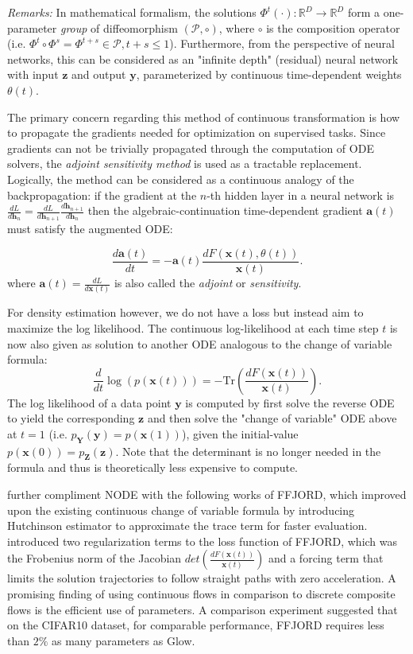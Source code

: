 \textit{Remarks: } In mathematical formalism, the solutions $\Phi^t(\cdot):
\mathbb{R}^D \to \mathbb{R}^D$ form a one-parameter \textit{group} of diffeomorphism
$(\mathcal{P}, \circ)$, where $\circ$ is the composition operator (i.e. $\Phi^t
\circ \Phi^s = \Phi^{t+s} \in \mathcal{P}, t+s \leq 1$). Furthermore, from the
perspective of neural networks, this can be considered as an "infinite depth"
(residual) neural network with input $\mathbf{z}$ and output $\mathbf{y}$,
parameterized by continuous time-dependent weights $\theta(t)$.

The primary concern regarding this method of continuous transformation is how
to propagate the gradients needed for optimization on supervised tasks. Since
gradients can not be trivially propagated through the computation of ODE
solvers, the \textit{adjoint sensitivity method} is used as a tractable
replacement. Logically, the method can be considered as a continuous analogy of
the backpropagation: if the gradient at the $n$-th hidden layer in a neural
network is $\frac{dL}{d \textbf{h}_n} = \frac{dL}{d \mathbf{h}_{n+1}} \frac{d
\mathbf{h}_{n+1}}{d \mathbf{h}_n}$ then the algebraic-continuation
time-dependent gradient $\mathbf{a}(t)$ must satisfy the augmented ODE:

$$
\frac{d\mathbf{a}(t)}{dt} = -\mathbf{a}(t) \frac{dF(\mathbf{x}(t),
\theta(t))}{\mathbf{x}(t)}
.$$
where $\mathbf{a}(t) = \frac{dL}{d\mathbf{x}(t)}$ is also called the \textit{adjoint} or
\textit{sensitivity}.

For density estimation however, we do not have a loss but instead aim to
maximize the log likelihood. The continuous log-likelihood
at each time step $t$ is now also given as solution to another ODE analogous to
the change of variable formula:
$$
\frac{d}{dt}\log(p(\mathbf{x}(t))) =
-\text{Tr}\left(\frac{dF(\mathbf{x}(t))}{\mathbf{x}(t)}\right)
.$$
The log likelihood of a data point $\mathbf{y}$ is computed by first solve the
reverse ODE to yield the corresponding $\mathbf{z}$ and then solve the "change of
variable" ODE above at $t=1$ (i.e. $p_{\mathbf{Y}}(\mathbf{y}) =
p(\mathbf{x}(1))$), given the initial-value $p(\mathbf{x}(0)) =
p_{\mathbf{Z}}(\mathbf{z})$.
Note that the determinant is no longer needed in the formula and thus is
theoretically less expensive to compute.

\citep{grathwohlFFJORDFreeformContinuous2018} further compliment NODE with the
following works of FFJORD, which improved upon the existing continuous change of
variable formula by introducing Hutchinson estimator to approximate the trace
term for faster evaluation. \citep{finlayHowTrainYour2020} introduced two
regularization terms to the loss function of FFJORD, which was the Frobenius
norm of the Jacobian $det\left(\frac{dF(\mathbf{x}(t))}{\mathbf{x}(t)}\right)$
and a forcing term that limits the solution trajectories to follow straight
paths with zero acceleration. A promising finding of using continuous flows in
comparison to discrete composite flows is the efficient use of parameters. A
comparison experiment suggested that on the CIFAR10 dataset, for comparable
performance, FFJORD requires less than $2\%$ as many parameters as Glow.


